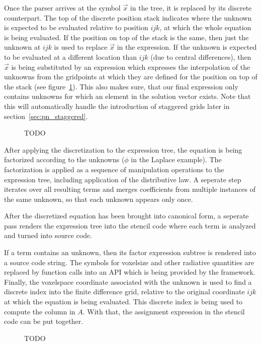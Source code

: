 Once the parser arrives at the symbol $\vec{x}$ in the tree, it is replaced by its discrete counterpart. The top of the discrete position stack indicates where the unknown is expected to be evaluated relative to position $ijk$, at which the whole equation is being evaluated. If the position on top of the stack is the same, then just the unknown at $ijk$ is used to replace $\vec{x}$ in the expression. If the unknown is expected to be evaluated at a different location than $ijk$ (due to central differences), then $\vec{x}$ is being substituted by an expression which expresses the interpolation of the unknowns from the gridpoints at which they are defined for the position on top of the stack (see figure~\ref{fig:pn_discretization_interpolation}). This also makes sure, that our final expression only contains unknowns for which an element in the solution vector exists. Note that this will automatically handle the introduction of staggered grids later in section~\ref{sec:pn_staggered}.
\begin{figure}[h]
\centering
{}
\caption{TODO}
\label{fig:pn_discretization_interpolation}
\end{figure}

After applying the discretization to the expression tree, the equation is being factorized according to the unknowns ($\phi$ in the Laplace example). The factorization is applied as a sequence of manipulation operations to the expression tree, including application of the distributive law. A seperate step iterates over all resulting terms and merges coefficients from multiple instances of the same unknown, so that each unknown appears only once. 

After the discretized equation has been brought into canonical form, a seperate pass renders the expression tree into the stencil code where each term is analyzed and turned into source code.

If a term contains an unknown, then its factor expression subtree is rendered into a source code string. The symbols for voxelsize and other radiative quantities are replaced by function calls into an API which is being provided by the framework. Finally, the voxelspace coordinate associated with the unknown is used to find a discrete index into the finite difference grid, relative to the original coordinate $ijk$ at which the equation is being evaluated. This discrete index is being used to compute the column in $A$. With that, the assignment expression in the stencil code can be put together.
\begin{figure}[h]
\centering
{}
\caption{TODO}
\label{fig:pn_discretization_codegen}
\end{figure}

